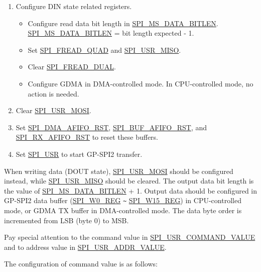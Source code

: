 \documentclass[main\_\_EN.tex]{subfiles}
\begin{document}
\begin{enumerate}
    \item Configure DIN state related registers.
        \begin{itemize}
            \item Configure read data bit length in \hyperref[fielddesc:SPIMSDATABITLEN]{SPI\_MS\_DATA\_BITLEN}. \hyperref[fielddesc:SPIMSDATABITLEN]{SPI\_MS\_DATA\_BITLEN} = bit length expected - 1.
            \item Set \hyperref[fielddesc:SPIFREADQUAD]{SPI\_FREAD\_QUAD} and \hyperref[fielddesc:SPIUSRMISO]{SPI\_USR\_MISO}.
            \item Clear \hyperref[fielddesc:SPIFREADDUAL]{SPI\_FREAD\_DUAL}.
            \item Configure GDMA in DMA-controlled mode. In CPU-controlled mode, no action is needed.
        \end{itemize}   
    
    \item Clear \hyperref[fielddesc:SPIUSRMOSI]{SPI\_USR\_MOSI}.
    \item Set \hyperref[fielddesc:SPIDMAAFIFORST]{SPI\_DMA\_AFIFO\_RST}, \hyperref[fielddesc:SPIBUFAFIFORST]{SPI\_BUF\_AFIFO\_RST}, and \hyperref[fielddesc:SPIRXAFIFORST]{SPI\_RX\_AFIFO\_RST} to reset these buffers.
    
    \item Set \hyperref[fielddesc:SPIUSR]{SPI\_USR} to start GP-SPI2 transfer.
\end{enumerate}

When writing data (DOUT state), \hyperref[fielddesc:SPIUSRMOSI]{SPI\_USR\_MOSI} should be configured instead, while \hyperref[fielddesc:SPIUSRMISO]{SPI\_USR\_MISO} should be cleared. The output data bit length is the value of \hyperref[fielddesc:SPIMSDATABITLEN]{SPI\_MS\_DATA\_BITLEN} + 1. Output data should be configured in GP-SPI2 data buffer (\hyperref[regdesc:SPIW0REG]{SPI\_W0\_REG} \verb+~+ \hyperref[regdesc:SPIW0REG]{SPI\_W15\_REG}) in CPU-controlled mode, or GDMA TX buffer in DMA-controlled mode. The data byte order is incremented from LSB (byte 0) to MSB.

Pay special attention to the command value in \hyperref[fielddesc:SPIUSRCOMMANDVALUE]{SPI\_USR\_COMMAND\_VALUE} and to address value in \hyperref[fielddesc:SPIUSRADDRVALUE]{SPI\_USR\_ADDR\_VALUE}. 

The configuration of command value is as follows:
\end{document}
